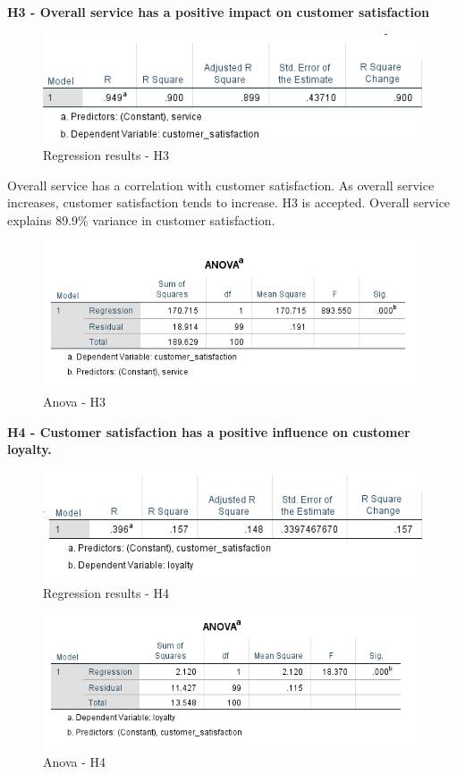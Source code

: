 \documentclass[a4paper, 14pt]{extarticle}
\begin{document}
{\par \textbf{H3 - Overall service has a positive impact on customer satisfaction}\\
\begin{figure}[H]
\centering
\includegraphics[scale=1]{sp_vs_cs.png}
\caption{Regression results - H3}
\end{figure}

Overall service has a correlation with customer satisfaction. As overall service increases, customer satisfaction tends to increase. H3 is accepted.
Overall service explains 89.9\% variance in customer satisfaction.

\begin{figure}[H]
\centering
\includegraphics[scale=1]{anova_css.png}
\caption{Anova - H3}
\end{figure}

\newpage
\par \textbf{H4 - Customer satisfaction has a positive influence on customer loyalty.}\\
\begin{figure}[H]
\centering
\includegraphics[scale=1]{customer_satisfaction_vs_loyalty.png}
\caption{Regression results - H4}
\end{figure}
\begin{figure}[H]
\centering
\includegraphics[scale=1]{anova_cs_lo.png}
\caption{Anova - H4}
\end{figure}

}
\end{document}
